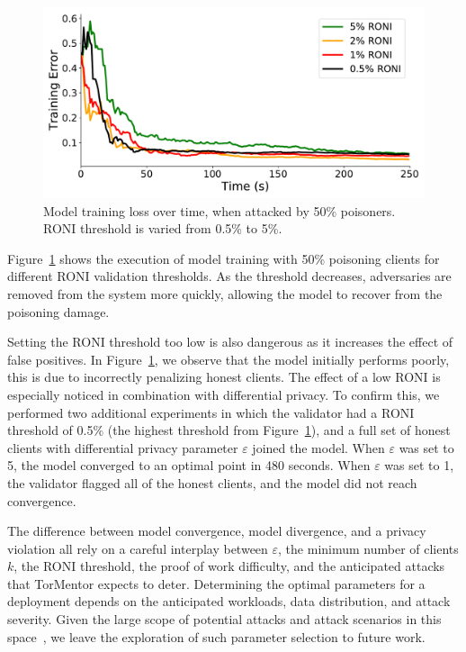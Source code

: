 \begin{figure}[t]
	\includegraphics[width=\linewidth]{fig/thresholds}
	\caption{Model training loss over time, when attacked by 50\%
	poisoners. RONI threshold is varied from 0.5\% to 5\%. 
        }
	\label{fig:thresholds}
\end{figure}

Figure~\ref{fig:thresholds} shows the execution of model training with
50\% poisoning clients for different RONI validation thresholds. As
the threshold decreases, adversaries are removed from the system more
quickly, allowing the model to recover from the poisoning damage.

Setting the RONI threshold too low is also dangerous as it increases
the effect of false positives. In Figure~\ref{fig:thresholds}, we
observe that the model initially performs poorly, this is due to
incorrectly penalizing honest clients. The effect of a low
RONI is especially noticed in combination with differential privacy. To
confirm this, we performed two additional experiments in which the
validator had a RONI threshold of 0.5\% (the highest threshold from
Figure~\ref{fig:thresholds}), and a full set of honest clients with
differential privacy parameter $\varepsilon$ joined the model. When
$\varepsilon$ was set to 5, the model converged to an optimal point in
480 seconds. When $\varepsilon$ was set to 1, the validator flagged
all of the honest clients, and the model did not reach convergence.

The difference between model convergence, model divergence, and a
privacy violation all rely on a careful interplay between
$\varepsilon$, the minimum number of clients $k$, the RONI threshold,
the proof of work difficulty, and the anticipated attacks that
TorMentor expects to deter. Determining the optimal parameters for a
deployment depends on the anticipated workloads, data distribution, and
attack severity. Given the large scope of potential attacks and
attack scenarios in this space~\cite{Huang:2011}, we leave the
exploration of such parameter selection to future work.
